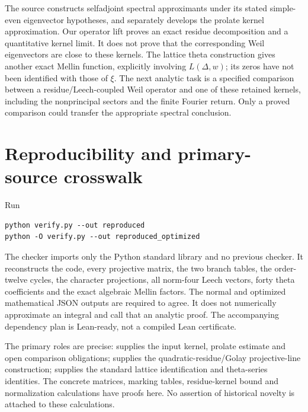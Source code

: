 \documentclass[11pt,reqno]{amsart}
\theoremstyle{definition}\newtheorem{definition}[theorem]{Definition}
\theoremstyle{remark}\newtheorem{remark}[theorem]{Remark}
\begin{document}
The source \cite{CCM} constructs selfadjoint spectral approximants under its stated simple-even eigenvector hypotheses, and separately develops the prolate kernel approximation. Our operator lift proves an exact residue decomposition and a quantitative kernel limit. It does not prove that the corresponding Weil eigenvectors are close to these kernels. The lattice theta construction gives another exact Mellin function, explicitly involving $L(\Delta,w)$; its zeros have not been identified with those of $\xi$.
The next analytic task is a specified comparison between a residue/Leech-coupled Weil operator and one of these retained kernels, including the nonprincipal sectors and the finite Fourier return. Only a proved comparison could transfer the appropriate spectral conclusion.

\section{Reproducibility and primary-source crosswalk}
Run
\begin{verbatim}
python verify.py --out reproduced
python -O verify.py --out reproduced_optimized
\end{verbatim}
The checker imports only the Python standard library and no previous checker. It reconstructs the code, every projective matrix, the two branch tables, the order-twelve cycles, the character projections, all norm-four Leech vectors, forty theta coefficients and the exact algebraic Mellin factors. The normal and optimized mathematical JSON outputs are required to agree. It does not numerically approximate an integral and call that an analytic proof. The accompanying dependency plan is Lean-ready, not a compiled Lean certificate.

The primary roles are precise: \cite[Section 7, equations (7.1)--(7.12), Lemmas 7.1--7.3; Section 8]{CCM} supplies the input kernel, prolate estimate and open comparison obligations; \cite[Section 1.6, p.~10]{Chapman} supplies the quadratic-residue/Golay projective-line construction; \cite[Theorems 1.1--1.4, pp.~1--4; Section 3, p.~6]{Brouwer} supplies the standard lattice identification and theta-series identities. The concrete matrices, marking tables, residue-kernel bound and normalization calculations have proofs here. No assertion of historical novelty is attached to these calculations.
\end{document}
